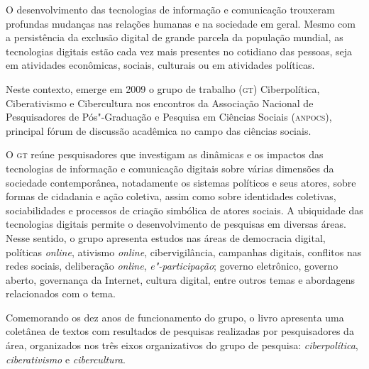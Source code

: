 

\begin{flushright}
\end{flushright}


\noindent{}O desenvolvimento das tecnologias de informação e comunicação trouxeram
profundas mudanças nas relações humanas e na sociedade em geral. Mesmo
com a persistência da exclusão digital de grande parcela da população
mundial, as tecnologias digitais estão cada vez mais presentes no
cotidiano das pessoas, seja em atividades econômicas, sociais, culturais
ou em atividades políticas.


Neste contexto, emerge em 2009 o grupo de trabalho (\textsc{gt}) Ciberpolítica,
Ciberativismo e Cibercultura nos encontros da Associação Nacional de
Pesquisadores de Pós"-Graduação e Pesquisa em Ciências Sociais (\textsc{anpocs}),
principal fórum de discussão acadêmica no campo das ciências sociais.

O \textsc{gt} reúne pesquisadores
que investigam as dinâmicas e os impactos das tecnologias de informação
e comunicação digitais sobre várias dimensões da sociedade
contemporânea, notadamente os sistemas políticos e seus atores, sobre
formas de cidadania e ação coletiva, assim como sobre identidades
coletivas, sociabilidades e processos de criação simbólica de atores
sociais. A ubiquidade das tecnologias digitais permite o desenvolvimento
de pesquisas em diversas áreas. Nesse sentido, o grupo apresenta estudos
nas áreas de democracia digital, políticas \textit{online}, ativismo \textit{online},
cibervigilância, campanhas digitais, conflitos nas redes sociais,
deliberação \textit{online}, \textit{e"-participação}; governo eletrônico, governo aberto,
governança da Internet, cultura digital, entre outros temas e abordagens
relacionados com o tema.

Comemorando os dez anos de funcionamento do grupo, o livro apresenta uma
coletânea de textos com resultados de pesquisas realizadas por
pesquisadores da área, organizados nos três eixos organizativos do grupo
de pesquisa: \textit{ciberpolítica}, \textit{ciberativismo} e \textit{cibercultura}.

